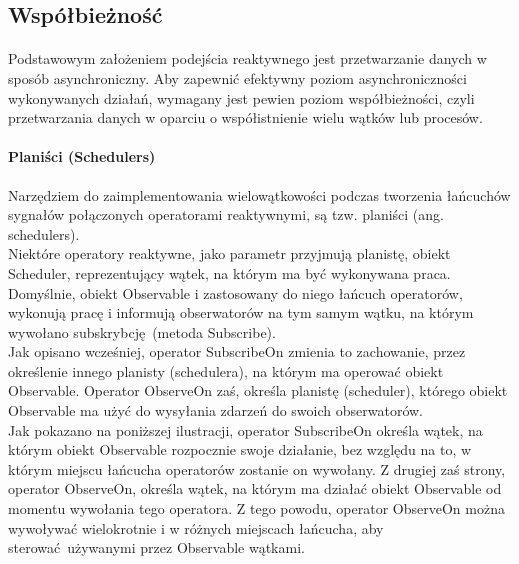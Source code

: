 \documentclass[12pt,oneside,a4paper]{report}
\begin{document}
\subsection{Współbieżność}
\paragraph{}Podstawowym założeniem podejścia reaktywnego jest przetwarzanie danych w sposób asynchroniczny. Aby zapewnić efektywny poziom asynchroniczności wykonywanych działań, wymagany jest pewien poziom współbieżności, czyli przetwarzania danych w oparciu o współistnienie wielu wątków lub procesów.
\paragraph{Planiści (Schedulers)}
Narzędziem do zaimplementowania wielowątkowości podczas tworzenia łańcuchów sygnałów połączonych operatorami reaktywnymi, są tzw. planiści (ang. schedulers).\\
Niektóre operatory reaktywne, jako parametr przyjmują planistę, obiekt Scheduler, reprezentujący wątek, na którym ma być wykonywana praca.\\
Domyślnie, obiekt Observable i zastosowany do niego łańcuch operatorów, wykonują pracę i informują obserwatorów na tym samym wątku, na którym wywołano subskrybcję (metoda Subscribe).\\
Jak opisano wcześniej, operator SubscribeOn zmienia to zachowanie, przez określenie innego planisty (schedulera), na którym ma operować obiekt Observable. Operator ObserveOn zaś, określa planistę (scheduler), którego obiekt Observable ma użyć do wysyłania zdarzeń do swoich obserwatorów.\\
Jak pokazano na poniższej ilustracji, operator SubscribeOn określa wątek, na którym obiekt Observable rozpocznie swoje działanie, bez względu na to, w którym miejscu łańcucha operatorów zostanie on wywołany. Z drugiej zaś strony, operator ObserveOn, określa wątek, na którym ma działać obiekt Observable od momentu wywołania tego operatora. Z tego powodu, operator ObserveOn można wywoływać wielokrotnie i w różnych miejscach łańcucha, aby sterować używanymi przez Observable wątkami. 
\end{document}
